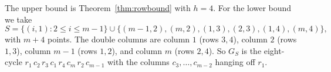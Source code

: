 
The upper bound is Theorem~\ref{thm:rowbound} with $h=4$. For the lower bound we take
\begin{equation}\label{eq:fourS}
S=\{(i,1):2\le i\le m-1\}\cup\{(m-1,2),(m,2),(1,3),(2,3),(1,4),(m,4)\},
\end{equation}
with $m+4$ points. The double columns are column $1$ (rows $3,4$), column $2$ (rows $1,3$), column $m-1$ (rows $1,2$), and column $m$ (rows $2,4$). So $G_S$ is the eight-cycle $r_1\,c_2\,r_3\,c_1\,r_4\,c_m\,r_2\,c_{m-1}$ with the columns $c_3,\ldots,c_{m-2}$ hanging off $r_1$.


